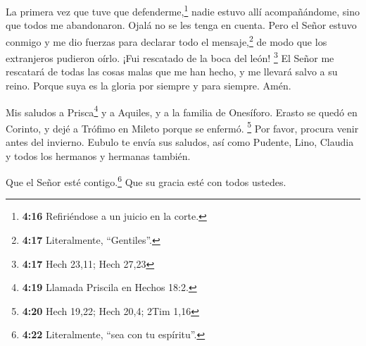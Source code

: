  La primera vez que tuve que defenderme,\footnote{\textbf{4:16}
  Refiriéndose a un juicio en la corte.} nadie estuvo allí
acompañándome, sino que todos me abandonaron. Ojalá no se les tenga en
cuenta.  Pero el Señor estuvo conmigo y me dio fuerzas
para declarar todo el mensaje,\footnote{\textbf{4:17} Literalmente,
  ``Gentiles''.} de modo que los extranjeros pudieron oírlo. ¡Fui
rescatado de la boca del león! \footnote{\textbf{4:17} Hech 23,11; Hech
  27,23}  El Señor me rescatará de todas las cosas malas
que me han hecho, y me llevará salvo a su reino. Porque suya es la
gloria por siempre y para siempre. Amén.

 Mis saludos a Prisca\footnote{\textbf{4:19} Llamada
  Priscila en Hechos 18:2.} y a Aquiles, y a la familia de Onesíforo.
 Erasto se quedó en Corinto, y dejé a Trófimo en Mileto
porque se enfermó. \footnote{\textbf{4:20} Hech 19,22; Hech 20,4; 2Tim
  1,16}  Por favor, procura venir antes del invierno.
Eubulo te envía sus saludos, así como Pudente, Lino, Claudia y todos los
hermanos y hermanas también.

 Que el Señor esté contigo.\footnote{\textbf{4:22}
  Literalmente, ``sea con tu espíritu''.} Que su gracia esté con todos
ustedes.
